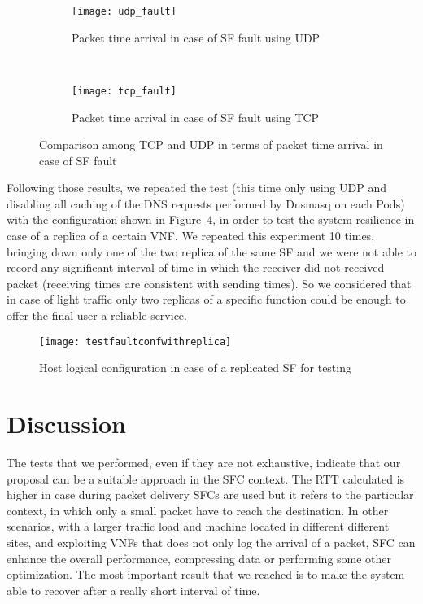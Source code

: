 \begin{figure}[]
    \begin{subfigure}[b]{0.9\textwidth}
        \texttt{[image: udp\_fault]}
        \caption{Packet time arrival in case of SF fault using UDP}
        \label{chap:tests:sec:fault:img:faultgraphudp}
    \end{subfigure}
    \\
    \begin{subfigure}[b]{0.9\textwidth}
        \texttt{[image: tcp\_fault]}
        \caption{Packet time arrival in case of SF fault using TCP}
        \label{chap:tests:sec:fault:img:faultgraphtcp}
    \end{subfigure}
    \caption{Comparison among TCP and UDP in terms of packet time arrival in
    case of SF fault}
    \label{chap:tests:sec:fault:img:faultgrapht}
\end{figure}

Following those results, we repeated the test (this time only using UDP and
disabling all caching of the DNS requests performed by Dnsmasq on each Pods)
with the configuration shown in
Figure~\ref{chap:tests:sec:fault:img:testfaultconfwithreplica}, in order to
test the system resilience in case of a replica of a certain VNF. We repeated
this experiment 10 times, bringing down only one of the two replica of the same
SF and we were not able to record any significant interval of time in which the
receiver did not received packet (receiving times are consistent with sending
times). So we considered that in case of light traffic only two replicas of a
specific function could be enough to offer the final user a reliable service.

\begin{figure}[H]
  \centering
  \texttt{[image: testfaultconfwithreplica]}
  \caption{Host logical configuration in case of a replicated SF for testing}
  \label{chap:tests:sec:fault:img:testfaultconfwithreplica}
\end{figure}

\section{Discussion}
The tests that we performed, even if they are not exhaustive, indicate that our
proposal can be a suitable approach in the SFC context.
The RTT calculated is higher in case during packet delivery SFCs are used
but it refers to the particular context, in which only a small packet have to
reach the destination. In other scenarios, with a larger traffic load and
machine located in different different sites, and exploiting VNFs that does not
only log the arrival of a packet, SFC can enhance the overall performance,
compressing data or performing some other optimization. The most important
result that we reached is to make the system able to recover after a really
short interval of time.